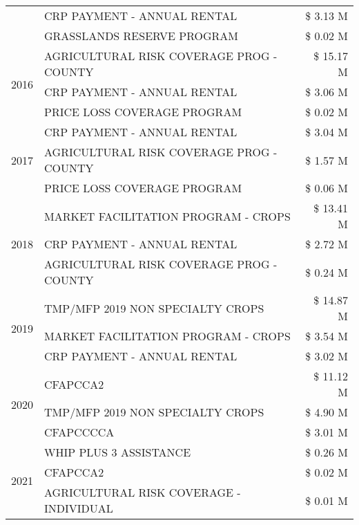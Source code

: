 \begin{tabular}{llr}
 & CRP PAYMENT - ANNUAL RENTAL & \$ 3.13 M \\
 & GRASSLANDS RESERVE PROGRAM & \$ 0.02 M \\
\cline{1-3}
\multirow[t]{3}{*}{2016} & AGRICULTURAL RISK COVERAGE PROG - COUNTY & \$ 15.17 M \\
 & CRP PAYMENT - ANNUAL RENTAL & \$ 3.06 M \\
 & PRICE LOSS COVERAGE PROGRAM & \$ 0.02 M \\
\cline{1-3}
\multirow[t]{3}{*}{2017} & CRP PAYMENT - ANNUAL RENTAL & \$ 3.04 M \\
 & AGRICULTURAL RISK COVERAGE PROG - COUNTY & \$ 1.57 M \\
 & PRICE LOSS COVERAGE PROGRAM & \$ 0.06 M \\
\cline{1-3}
\multirow[t]{3}{*}{2018} & MARKET FACILITATION PROGRAM - CROPS & \$ 13.41 M \\
 & CRP PAYMENT - ANNUAL RENTAL & \$ 2.72 M \\
 & AGRICULTURAL RISK COVERAGE PROG - COUNTY & \$ 0.24 M \\
\cline{1-3}
\multirow[t]{3}{*}{2019} & TMP/MFP 2019 NON SPECIALTY CROPS & \$ 14.87 M \\
 & MARKET FACILITATION PROGRAM - CROPS & \$ 3.54 M \\
 & CRP PAYMENT - ANNUAL RENTAL & \$ 3.02 M \\
\cline{1-3}
\multirow[t]{3}{*}{2020} & CFAPCCA2 & \$ 11.12 M \\
 & TMP/MFP 2019 NON SPECIALTY CROPS & \$ 4.90 M \\
 & CFAPCCCCA & \$ 3.01 M \\
\cline{1-3}
\multirow[t]{3}{*}{2021} & WHIP PLUS 3 ASSISTANCE & \$ 0.26 M \\
 & CFAPCCA2 & \$ 0.02 M \\
 & AGRICULTURAL RISK COVERAGE - INDIVIDUAL & \$ 0.01 M \\
\cline{1-3}
\bottomrule
\end{tabular}
